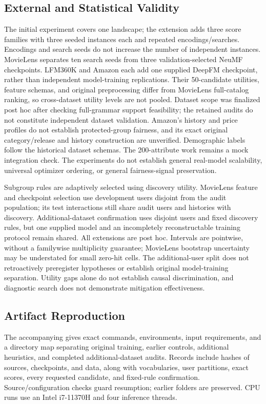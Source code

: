 \documentclass[sigconf,nonacm]{acmart}
\begin{document}
\subsection{External and Statistical Validity}
The initial experiment covers one landscape; the extension adds three score families with three seeded instances each and repeated encodings/searches. Encodings and search seeds do not increase the number of independent instances. MovieLens separates ten search seeds from three validation-selected NeuMF checkpoints. LFM360K and Amazon each add one supplied DeepFM checkpoint, rather than independent model-training replications. Their 50-candidate utilities, feature schemas, and original preprocessing differ from MovieLens full-catalog ranking, so cross-dataset utility levels are not pooled. Dataset scope was finalized post hoc after checking full-grammar support feasibility; the retained audits do not constitute independent dataset validation. Amazon's history and price profiles do not establish protected-group fairness, and its exact original category/release and history construction are unverified. Demographic labels follow the historical dataset schemas. The 200-attribute work remains a mock integration check. The experiments do not establish general real-model scalability, universal optimizer ordering, or general fairness-signal preservation.

Subgroup rules are adaptively selected using discovery utility. MovieLens feature and checkpoint selection use development users disjoint from the audit population; its test interactions still share audit users and histories with discovery. Additional-dataset confirmation uses disjoint users and fixed discovery rules, but one supplied model and an incompletely reconstructable training protocol remain shared. All extensions are post hoc. Intervals are pointwise, without a familywise multiplicity guarantee; MovieLens bootstrap uncertainty may be understated for small zero-hit cells. The additional-user split does not retroactively preregister hypotheses or establish original model-training separation. Utility gaps alone do not establish causal discrimination, and diagnostic search does not demonstrate mitigation effectiveness.

\subsection{Artifact Reproduction}
The accompanying  gives exact commands, environments, input requirements, and a directory map separating original training, earlier controls, additional heuristics, and completed additional-dataset audits. Records include hashes of sources, checkpoints, and data, along with vocabularies, user partitions, exact scores, every requested candidate, and fixed-rule confirmation. Source/configuration checks guard resumption; earlier folders are preserved. CPU runs use an Intel i7-11370H and four inference threads.
\end{document}
